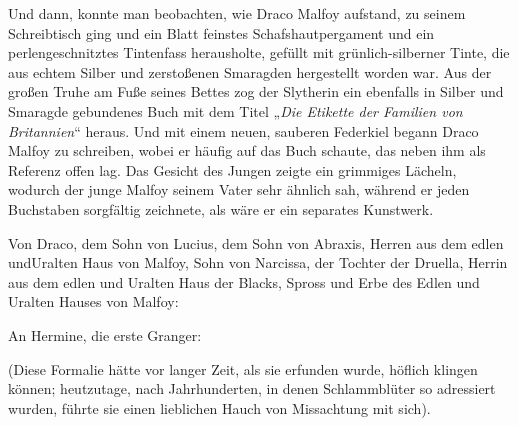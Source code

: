 Und dann, konnte man beobachten, wie Draco Malfoy aufstand, zu seinem Schreibtisch ging und ein Blatt feinstes Schafshautpergament und ein perlengeschnitztes Tintenfass herausholte, gefüllt mit grünlich-silberner Tinte, die aus echtem Silber und zerstoßenen Smaragden hergestellt worden war. Aus der großen Truhe am Fuße seines Bettes zog der Slytherin ein ebenfalls in Silber und Smaragde gebundenes Buch mit dem Titel „\emph{Die Etikette der Familien von Britannien}“ heraus. Und mit einem neuen, sauberen Federkiel begann Draco Malfoy zu schreiben, wobei er häufig auf das Buch schaute, das neben ihm als Referenz offen lag. Das Gesicht des Jungen zeigte ein grimmiges Lächeln, wodurch der junge Malfoy seinem Vater sehr ähnlich sah, während er jeden Buchstaben sorgfältig zeichnete, als wäre er ein separates Kunstwerk.

\begin{writtenNote}
Von Draco, dem Sohn von Lucius, dem Sohn von Abraxis, Herren aus dem edlen undUralten Haus von Malfoy, Sohn von Narcissa, der Tochter der Druella, Herrin aus dem edlen und Uralten Haus der Blacks, Spross und Erbe des Edlen und Uralten Hauses von Malfoy:

An Hermine, die erste Granger:
\end{writtenNote}

(Diese Formalie hätte vor langer Zeit, als sie erfunden wurde, höflich klingen können; heutzutage, nach Jahrhunderten, in denen Schlammblüter so adressiert wurden, führte sie einen lieblichen Hauch von Missachtung mit sich).

